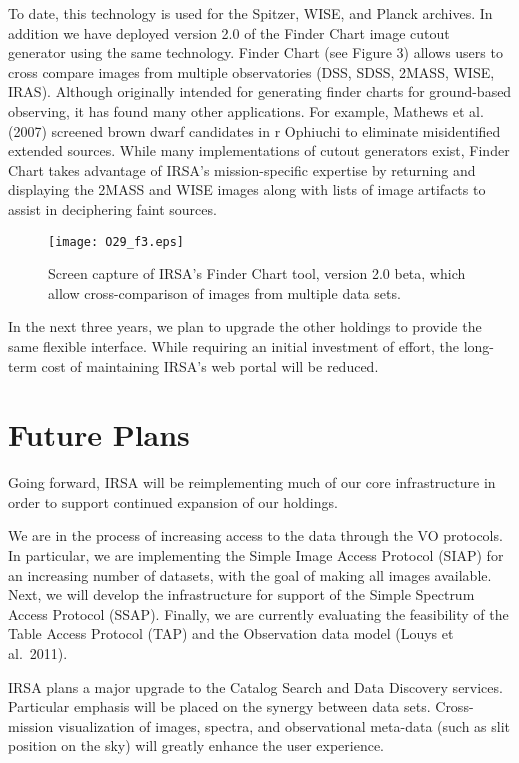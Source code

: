 \documentclass[11pt,twoside]{article}
\begin{document}
To date, this technology is used for the Spitzer, WISE, and Planck
archives. In addition we have deployed version 2.0 of the Finder Chart
image cutout generator using the same technology.  Finder Chart (see
Figure 3) allows users to cross compare images from multiple
observatories (DSS, SDSS, 2MASS, WISE, IRAS). Although originally
intended for generating finder charts for ground-based observing, it
has found many other applications. For example, Mathews et al. (2007)
screened brown dwarf candidates in r Ophiuchi to eliminate
misidentified extended sources. While many implementations of cutout
generators exist, Finder Chart takes advantage of IRSA’s
mission-specific expertise by returning and displaying the 2MASS and
WISE images along with lists of image artifacts to assist in
deciphering faint sources.

\begin{figure}[t]

\centering
\texttt{[image: O29\_f3.eps]}
\caption{Screen capture of IRSA's Finder Chart tool, version 2.0 beta,
which allow cross-comparison of images from multiple data sets.}

\end{figure}


In the next three years, we plan to upgrade the other holdings to
provide the same flexible interface. While requiring an initial
investment of effort, the long-term cost of maintaining IRSA’s web
portal will be reduced.

\section{Future Plans}

Going forward, IRSA will be reimplementing much of our core
infrastructure in order to support continued expansion of our
holdings.  

We are in the process of increasing access to the data through the VO
protocols.  In particular, we are implementing the Simple Image Access
Protocol (SIAP) for an increasing number of datasets, with the goal of making
all images available.  Next, we will develop the infrastructure for
support of the Simple Spectrum Access Protocol (SSAP). Finally, we are
currently evaluating the feasibility of the Table Access Protocol
(TAP) and the Observation data model (Louys et al.\ 2011).

IRSA plans a major upgrade to the Catalog Search and Data
Discovery services.  Particular emphasis will be placed on the synergy
between data sets.
Cross-mission visualization of images, spectra, and observational
meta-data (such as slit position on the sky) will greatly enhance the
user experience.
\end{document}
